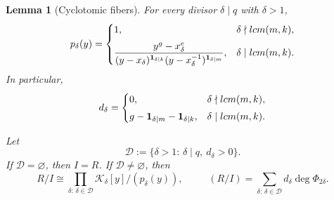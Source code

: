 \documentclass[10pt,a4paper]{amsart}
\newtheorem{lemma}{Lemma}
\newcommand{\Q}{{\mathbb{Q}}}
\DeclareMathOperator{\dimQ}{dim_{\Q}}
\newcommand{\lcm}{{\rm lcm}}
\begin{document}
\begin{lemma}[Cyclotomic fibers]\label{lem:pretzel-local-uniform}
For every divisor \(\delta\mid q\) with \(\delta>1\),
\begin{equation}\label{eq:pretzel-local-factor}
p_\delta(y)=
\begin{cases}
1,
& \delta\nmid\lcm(m,k),
\\[6pt]
\displaystyle
\frac{y^g-x_\delta^e}
 {(y-x_\delta)^{\mathbf 1_{\delta\mid k}}
  (y-x_\delta^{-1})^{\mathbf 1_{\delta\mid m}}},
& \delta\mid\lcm(m,k).
\end{cases}
\end{equation}
In particular,
\begin{equation}\label{eq:pretzel-local-degree}
d_\delta=
\begin{cases}
0,
& \delta\nmid\lcm(m,k),
\\[3pt]
g-\mathbf 1_{\delta\mid m}-\mathbf 1_{\delta\mid k},
& \delta\mid\lcm(m,k).
\end{cases}
\end{equation}

Let
\[
\mathcal D:=
\{\delta>1:\,\delta\mid q,\ d_\delta>0\}.
\]
If \(\mathcal D=\varnothing\), then \(I=R\).  If
\(\mathcal D\ne\varnothing\), then
\[
R/I\cong
\prod_{\delta:\,\delta\in\mathcal D}
\mathcal K_\delta[y]/(p_\delta(y)),
\qquad
\dimQ(R/I)=
\sum_{\delta:\,\delta\in\mathcal D}d_\delta\deg\Phi_{2\delta}.
\]
\end{lemma}
\end{document}
